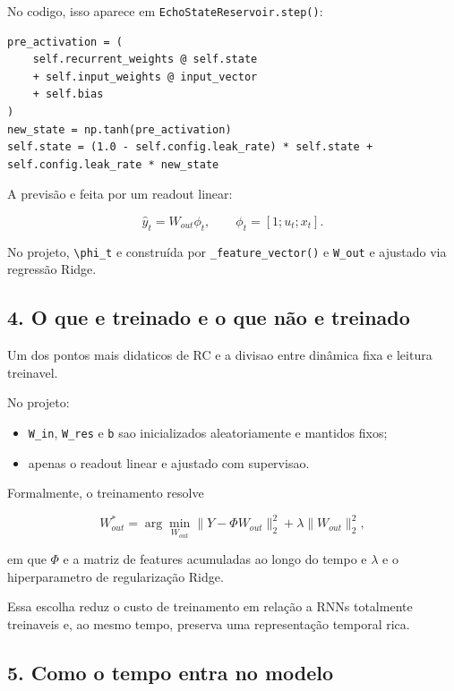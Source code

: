\documentclass[12pt]{article}
\providecommand{\tightlist}{%
          \setlength{\itemsep}{0pt}\setlength{\parskip}{0pt}}
\begin{document}
No codigo, isso aparece em \texttt{EchoStateReservoir.step()}:

\begin{verbatim}
pre_activation = (
    self.recurrent_weights @ self.state
    + self.input_weights @ input_vector
    + self.bias
)
new_state = np.tanh(pre_activation)
self.state = (1.0 - self.config.leak_rate) * self.state + self.config.leak_rate * new_state
\end{verbatim}

A previsão e feita por um readout linear:

\[
\hat{y}_t = W_{out} \phi_t,
\qquad
\phi_t = [1; u_t; x_t].
\]

No projeto, \texttt{\textbackslash{}phi\_t} e construída por \texttt{\_feature\_vector()} e \texttt{W\_out} e ajustado via regressão Ridge.

\subsection{4. O que e treinado e o que não e treinado}\label{4-o-que-e-treinado-e-o-que-nuxe3o-e-treinado}

Um dos pontos mais didaticos de RC e a divisao entre dinâmica fixa e leitura treinavel.

No projeto:

\begin{itemize}
\tightlist
\item
  \texttt{W\_in}, \texttt{W\_res} e \texttt{b} sao inicializados aleatoriamente e mantidos fixos;
\item
  apenas o readout linear e ajustado com supervisao.
\end{itemize}

Formalmente, o treinamento resolve

\[
W_{out}^* = \arg\min_{W_{out}}
\|Y - \Phi W_{out}\|_2^2 + \lambda \|W_{out}\|_2^2,
\]

em que \(\Phi\) e a matriz de features acumuladas ao longo do tempo e \(\lambda\) e o hiperparametro de regularização Ridge.

Essa escolha reduz o custo de treinamento em relação a RNNs totalmente treinaveis e, ao mesmo tempo, preserva uma representação temporal rica.

\subsection{5. Como o tempo entra no modelo}\label{5-como-o-tempo-entra-no-modelo}
\end{document}
